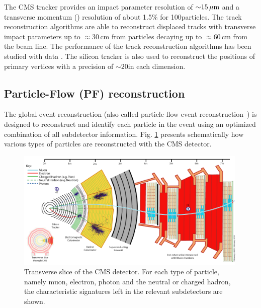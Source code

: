 The CMS tracker provides an impact parameter resolution of ${\sim}15\,\mu\text{m}$ and a transverse momentum (\pt) resolution of about 1.5\% for 100\GeV particles. 
The track reconstruction algorithms are able to reconstruct displaced tracks with transverse impact
parameters up to ${\approx}30$\,cm from particles decaying up to ${\approx}60$\,cm from the beam line.  The
performance of the track reconstruction algorithms has been studied with data
\cite{Khachatryan:2010pw}. 
The silicon
tracker is also used to reconstruct the positions of primary vertices with a
precision of ${\sim}20$\mum in each dimension.

\subsection{Particle-Flow (PF) reconstruction}

The global event reconstruction (also called particle-flow event reconstruction~\cite{CMS-PAS-PFT-09-001,CMS-PAS-PFT-10-001}) is designed to reconstruct and identify each particle in the event using an optimized combination of all subdetector information.
Fig. \ref{fig:cmsslice} presents schematically how various types of particles are reconstructed
with the CMS detector.

\begin{figure}[htbp]
\centering
\includegraphics[width=0.99\textwidth]{plots/intro/CMS_Slice.png}
\caption{Transverse slice of the CMS detector. For each type of particle, namely muon, electron,
 photon and the neutral or charged hadron, the characteristic
signatures left in the relevant subdetectors are shown. \label{fig:cmsslice}}
\end{figure}
 

